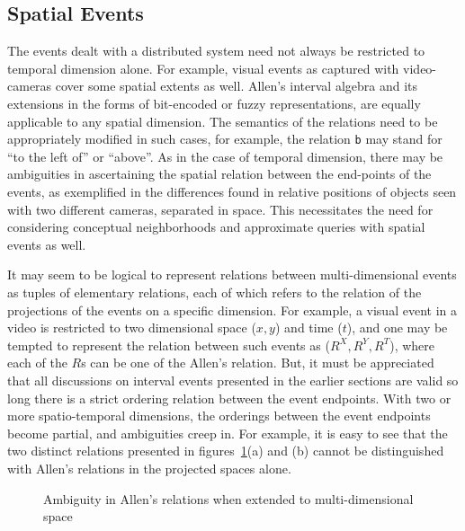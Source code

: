 \subsection{Spatial Events}

The events dealt with a distributed system need not always be restricted to temporal dimension alone. For example, visual events
as captured with video-cameras cover some spatial extents as well. Allen's interval algebra and its extensions in the forms of
bit-encoded or fuzzy representations, are equally applicable to any spatial dimension. The semantics of the relations need to be 
appropriately modified in such cases, for example, the relation \texttt{b} may stand for ``to the left of'' or ``above''. 
%
As in the case of temporal dimension, there may be ambiguities in ascertaining the spatial relation between the end-points of
the events, as exemplified in the differences found in relative positions of objects seen with two different cameras, separated
in space. This necessitates the need for considering conceptual neighborhoods and approximate queries with spatial events as well.

It may seem to be logical to represent relations between multi-dimensional events as tuples of elementary relations, each of which 
refers to the relation of the projections of the events on a specific dimension. For example, a visual event in a video is restricted 
to two dimensional space ($x,y$) and time  ($t$), and one may be tempted to represent the relation between such events as 
($R^X, R^Y, R^T$), where each of the $R$s can be one of the Allen's relation. But, it must  be appreciated that all discussions on 
interval events presented in the earlier sections are valid so long there is a strict ordering relation between the event endpoints. 
With two or more spatio-temporal dimensions, the orderings between the event endpoints become partial, and ambiguities creep in. For 
example, it is easy to see that the two distinct relations presented in figures~\ref{fig:clock:Allen-ambiguity}(a) and (b) cannot 
be distinguished with Allen's relations in the projected spaces alone.


\begin{figure}[htbp!]
	\caption{Ambiguity in Allen's relations when extended to multi-dimensional space}
	\label{fig:clock:Allen-ambiguity}
\end{figure}

